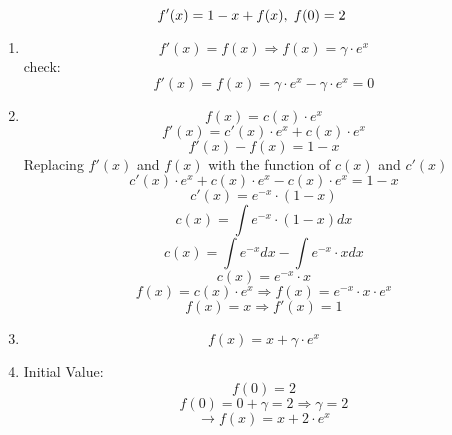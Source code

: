 \documentclass{article}
\begin{document}
\begin{equation*} f'(x) = 1 - x + f(x), \hspace{1mm} f(0) = 2 \end{equation*} 
\begin{enumerate} 
    \item {} 
    \begin{equation*}f'(x) = f(x) \Rightarrow f(x) = \gamma \cdot e^{x} \end{equation*}
    check: \begin{equation*} f'(x) = f(x) = \gamma \cdot e^{x} - \gamma \cdot e^{x} = 0 \end{equation*}
    \item {} 
    \begin{equation*} f(x) = c(x) \cdot e^{x} \end{equation*}
    \begin{equation*} f'(x) = c'(x) \cdot e^{x} + c(x) \cdot e^{x} \end{equation*} 
    \begin{equation*} f'(x) - f(x) = 1 - x \end{equation*}  
    \newpage
    Replacing $f'(x)$ and $f(x)$ with the function of $c(x)$ and $c'(x)$
    \begin{equation*} c'(x) \cdot e^{x} + c(x) \cdot e^{x} - c(x) \cdot e^{x} = 1 - x \end{equation*} 
    \begin{equation*}  c'(x) = e^{-x} \cdot (1-x) \end{equation*}
    \begin{equation*}  c(x) = \int e^{-x} \cdot (1-x) dx \end{equation*}
    \begin{equation*}  c(x) = \int e^{-x} dx - \int e^{-x} \cdot x dx \end{equation*}
    \begin{equation*}  c(x) = e^{-x} \cdot x \end{equation*}
 \begin{equation*} f(x) = c(x) \cdot e^{x} \Rightarrow f(x) = e^{-x} \cdot x \cdot e^{x} \end{equation*}
\begin{equation*} f(x) = x \Rightarrow f'(x) = 1 \end{equation*}
    \item {} \newline
          \begin{equation*} f(x) = x + \gamma \cdot e^{x} \end{equation*}
    \item Initial Value: \begin{equation*} f(0) = 2 \end{equation*} 
         \begin{equation*} f(0) = 0 + \gamma = 2 \Rightarrow \gamma = 2 \end{equation*}
         \begin{equation*} \rightarrow  f(x) = x + 2 \cdot e^{x} \end{equation*}
\end{enumerate} 
\end{document}
